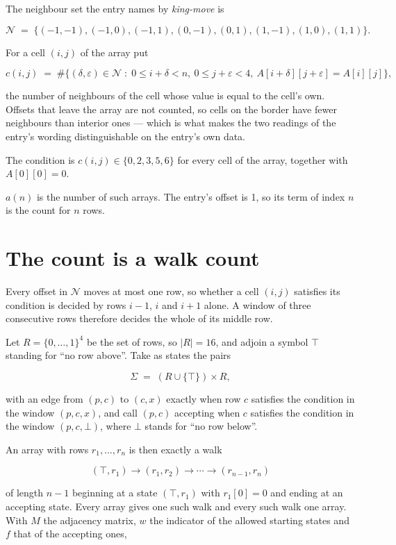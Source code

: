 \documentclass[11pt]{article}
\theoremstyle{definition}
\begin{document}
The neighbour set the entry names by {\itshape king-move} is

\[\mathcal{N} \;=\; \{(-1,-1), (-1,0), (-1,1), (0,-1), (0,1), (1,-1), (1,0), (1,1)\}.\]

For a cell $(i,j)$ of the array put

\[c(i,j) \;=\; \#\bigl\{(\delta,\varepsilon)\in\mathcal{N} \;:\; 0\le i+\delta<n,\ 0\le j+\varepsilon<4,\ A[i+\delta][j+\varepsilon] = A[i][j]\bigr\},\]

the number of neighbours of the cell whose value is equal to the cell's own. Offsets that leave the array are not counted, so cells on the border have fewer neighbours than interior ones --- which is what makes the two readings of the entry's wording distinguishable on the entry's own data.

The condition is $c(i,j) \in \{0, 2, 3, 5, 6\}$ for every cell of the array, together with $A[0][0]=0$.

$a(n)$ is the number of such arrays. The entry's offset is 1, so its term of index $n$ is the count for $n$ rows.

\section{The count is a walk count}

Every offset in $\mathcal{N}$ moves at most one row, so whether a cell $(i,j)$ satisfies its condition is decided by rows $i-1$, $i$ and $i+1$ alone. A window of three consecutive rows therefore decides the whole of its middle row.

Let $R = \{0,\dots,1\}^{4}$ be the set of rows, so $|R| = 16$, and adjoin a symbol $\top$ standing for ``no row above''. Take as states the pairs

\[\Sigma \;=\; (R \cup \{\top\}) \times R,\]

with an edge from $(p,c)$ to $(c,x)$ exactly when row $c$ satisfies the condition in the window $(p,c,x)$, and call $(p,c)$ accepting when $c$ satisfies the condition in the window $(p,c,\bot)$, where $\bot$ stands for ``no row below''.

An array with rows $r_1,\dots,r_n$ is then exactly a walk

\[(\top,r_1) \to (r_1,r_2) \to \cdots \to (r_{n-1},r_n)\]

of length $n-1$ beginning at a state $(\top,r_1)$ with $r_1[0]=0$ and ending at an accepting state. Every array gives one such walk and every such walk one array. With $M$ the adjacency matrix, $w$ the indicator of the allowed starting states and $f$ that of the accepting ones,
\end{document}
